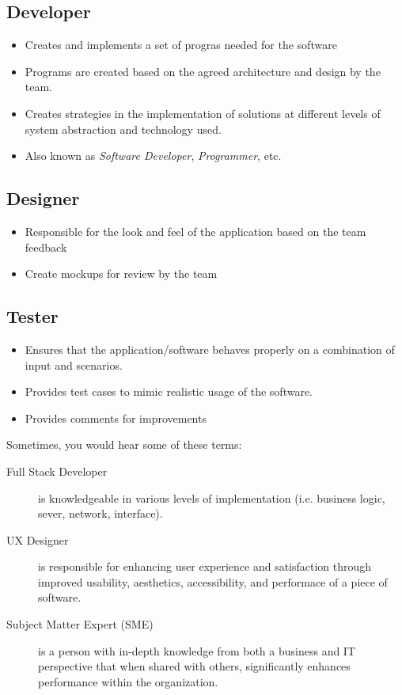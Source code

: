 \documentclass[9pt,twocolumn]{article}
\begin{document}
  \subsection*{Developer}
  \begin{itemize}
    \item Creates and implements a set of progras needed for the software
    \item Programs are created based on the agreed architecture and design by the team.
    \item Creates strategies in the implementation of solutions at different levels of system abstraction and technology used.
    \item Also known as \emph{Software Developer}, \emph{Programmer}, etc.
  \end{itemize}

  \subsection*{Designer}
  \begin{itemize}
    \item Responsible for the look and feel of the application based on the team feedback
    \item Create mockups for review by the team
  \end{itemize}

  \subsection*{Tester}
  \begin{itemize}
    \item Ensures that the application/software behaves properly on a combination of input and scenarios.
    \item Provides test cases to mimic realistic usage of the software.
    \item Provides comments for improvements
  \end{itemize}

  Sometimes, you would hear some of these terms:
  \begin{description}
    \item[Full Stack Developer] is knowledgeable in various levels of implementation (i.e. business logic, sever, network, interface).
    \item[UX Designer] is responsible for enhancing user experience and satisfaction through improved usability, aesthetics, accessibility, and performace of a piece of software.
    \item[Subject Matter Expert (SME)] is a person with in-depth knowledge from both a business and IT perspective that when shared with others, significantly enhances performance within the organization.
  \end{description}
\end{document}

